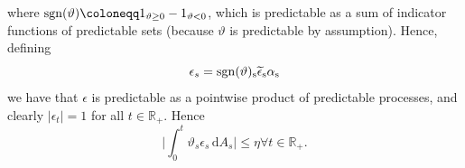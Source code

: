 \documentclass[11pt,a4paper,twoside,openany]{report}
\numberwithin{equation}{section}
\newcommand{\diff}{\mathrm{d}}
\theoremstyle{plain} %
\theoremstyle{definition} %
\theoremstyle{remark} %
\begin{document}
where \(\rm{sgn}(\vartheta)\coloneqq1_{\vartheta\geq 0}-1_{\vartheta<0}\), which is predictable as a sum of indicator functions of predictable sets (because \(\vartheta\) is predictable by assumption). 
Hence, defining
\begin{equation*}
    \epsilon_s = \rm{sgn}(\vartheta)_s\widetilde{\epsilon}_s\alpha_s
\end{equation*}
we have that \(\epsilon\) is predictable as a pointwise product of predictable processes, and clearly \(|\epsilon_t|=1\) for all \(t\in\mathbb{R}_+\). Hence 
\begin{equation*}
\bigg|\int_0^t\vartheta_s\epsilon_s\,\diff A_s\bigg|\leq\eta\forall t\in\mathbb{R}_+.
\end{equation*}
\end{document}
